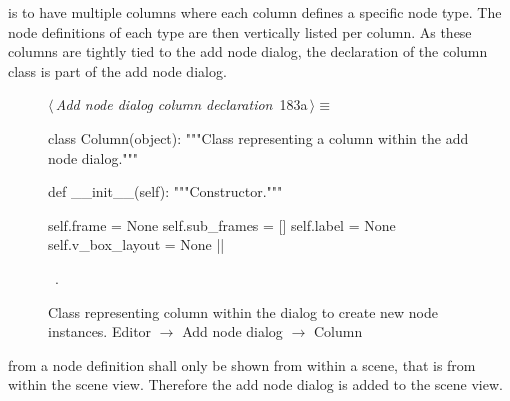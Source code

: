\documentclass[%
    a4paper,    %
    justified,  %
    nobib,      %
    openany     %
]{tufte-book}
\makeatletter
\renewcommand{\label}[1]{\@tufte@label{##1}}%
\makeatother
\begin{document}
 is to have multiple columns
where each column defines a specific node type. The node definitions of each
type are then vertically listed per column. As these columns are tightly tied to
the add node dialog, the declaration of the column class is part of the add node
dialog.

\begin{figure}[!htbp]
\begin{flushleft} \small
\begin{minipage}{\linewidth}\label{scrap155}\raggedright\small
{} $\langle\,${\itshape Add node dialog column declaration}\nobreak\ {\footnotesize {183a}}$\,\rangle\equiv$
\vspace{-1ex}
\begin{pythoncode}
class Column(object):
    """Class representing a column within the add node dialog."""

    def __init__(self):
        """Constructor."""

        self.frame         = None
        self.sub_frames    = []
        self.label         = None
        self.v_box_layout  = None
|\NWsep|
\end{pythoncode}
\vspace{1.5ex}
\footnotesize
\begin{list}{}{\setlength{\itemsep}{-\parsep}\setlength{\itemindent}{-\leftmargin}}
\item \NWtxtMacroRefIn\ .

\item{}
\end{list}
\end{minipage}\vspace{4ex}
\end{flushleft}
\caption{Class representing column within the dialog to create new node
  instances.
  \newline{}\newline{}Editor $\rightarrow$ Add node dialog $\rightarrow$ Column}
\end{figure}

 from a node definition shall
only be shown from within a scene, that is from within the scene view. Therefore
the add node dialog is added to the scene view.
\end{document}
